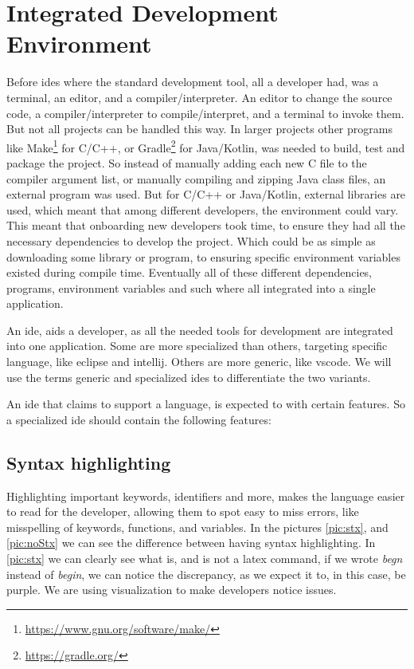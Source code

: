 \section{Integrated Development Environment} \label{sec:ide}

Before \gls*{ide}s where the standard development tool, all a developer had, was
a terminal, an editor, and a compiler/interpreter. An editor to change the
source code, a compiler/interpreter to compile/interpret, and a terminal to
invoke them. But not all projects can be handled this way. In larger projects
other programs like
Make\footnote{\url{https://www.gnu.org/software/make/}} for C/C++, or
Gradle\footnote{\url{https://gradle.org/}} for Java/Kotlin, was needed to
build, test and package the project. So instead of manually adding each new C
file to the compiler argument list, or manually compiling and zipping Java class
files, an external program was used. But for C/C++ or Java/Kotlin, external
libraries are used, which meant that among different developers, the environment
could vary. This meant that onboarding new developers took time, to ensure they
had all the necessary dependencies to develop the project. Which could be as
simple as downloading some library or program, to ensuring specific environment
variables existed during compile time. Eventually all of these different
dependencies, programs, environment variables and such where all integrated into
a single application.

An \gls*{ide}, aids a developer, as all the needed tools for development are
integrated into one application. Some are more specialized than others,
targeting specific language, like \gls*{eclipse} and \gls*{intellij}. Others are
more generic, like \gls*{vscode}. We will use the terms generic and specialized
\gls*{ide}s to differentiate the two variants.

An \gls*{ide} that claims to support a language, is expected to with certain
features. So a specialized \gls*{ide} should contain the following features:

\subsection{Syntax highlighting}

Highlighting important keywords, identifiers and more, makes the language easier
to read for the developer, allowing them to spot easy to miss errors, like
misspelling of keywords, functions, and variables. In the pictures
\ref{pic:stx}, and \ref{pic:noStx} we can see the difference between having
syntax highlighting. In \ref{pic:stx} we can clearly see what is, and is not a
latex command, if we wrote \textit{begn} instead of \textit{begin}, we can
notice the discrepancy, as we expect it to, in this case, be purple. We are
using visualization to make developers notice issues.

